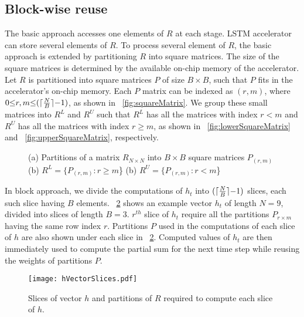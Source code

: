 \subsection{Block-wise reuse}
The basic approach accesses one elements of $R$ at each stage. LSTM accelerator can store several elements of $R$. To process several element of $R$, the basic approach is extended by partitioning $R$ into square matrices. The size of the square matrices is determined by the available on-chip memory of the accelerator. Let $R$ is partitioned into square matrices $P$ of size $B{\times}B$, such that $P$ fits in the accelerator's on-chip memory. Each $P$ matrix can be indexed as $(r,m)$, where $0{\le}r,m{\le} (\lceil\frac{N}{B}\rceil{-}1)$, as shown in \figurename{~\ref{fig:squareMatrix}}. We group these small matrices into $R^L$ and $R^U$ such that $R^L$ has all the matrices with index $r{<}m$  and $R^U$ has all the matrices with index $r{\geq}m$, as shown in \figurename{~\ref{fig:lowerSquareMatrix}} and \figurename{~\ref{fig:upperSquareMatrix}}, respectively.
\begin{figure}[htb!]
	\centering
	\caption{(a) Partitions of a matrix $R_{N{\times}N}$ into $B{\times}B$ square matrices $P_{(r,m)}$ (b) $R^L{=}\{P_{(r,m)}:r{\geq}m$\} (b) $R^U{=}\{P_{(r,m)}:r{<}m$\}	}
	\label{fig:SquareMatrices}
	\vspace{-1.0em}	
\end{figure} 

In block approach, we divide the computations of $h_t$ into $(\lceil\frac{N}{B}\rceil{-}1)$ slices, each such slice having $B$ elements. \figurename{~\ref{fig:hVectorSlices}} shows an example vector $h_t$ of length $N{=}9$, divided into slices of length $B{=}3$. $r^{th}$ slice of $h_t$ require all the partitions $P_{r{\times}m}$ having the same row index $r$. Partitions $P$ used in the computations of each slice of $h$ are also shown under each slice in \figurename{~\ref{fig:hVectorSlices}}. Computed values of $h_t$ are then immediately used to compute the partial sum for the next time step while reusing the weights of partitions $P$.  
\begin{figure}[!htb]
	\centerline{\texttt{[image: hVectorSlices.pdf]}}
	\caption{Slices of vector $h$ and partitions of $R$ required to compute each slice of $h$.}
	\label{fig:hVectorSlices}
	\vspace{-1.0em}	
\end{figure}

